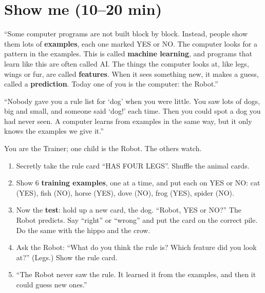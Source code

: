 \section{Show me (10--20 min)}
\begin{teacherscript}
\enquote{Some computer programs are not built block by block. Instead, people show them lots of \textbf{examples}, each one marked YES or NO. The computer looks for a pattern in the examples. This is called \textbf{machine learning}, and programs that learn like this are often called AI. The things the computer looks at, like legs, wings or fur, are called \textbf{features}. When it sees something new, it makes a guess, called a \textbf{prediction}. Today one of you is the computer: the Robot.}
\end{teacherscript}

\begin{analogy}
\enquote{Nobody gave you a rule list for \enquote{dog} when you were little. You saw lots of dogs, big and small, and someone said \enquote{dog!} each time. Then you could spot a dog you had never seen. A computer learns from examples in the same way, but it only knows the examples we give it.}
\end{analogy}

\begin{workedexample}
You are the Trainer; one child is the Robot. The others watch.
\begin{enumerate}[leftmargin=1.4em,itemsep=1pt]
  \item Secretly take the rule card \enquote{HAS FOUR LEGS}. Shuffle the animal cards.
  \item Show 6 \textbf{training examples}, one at a time, and put each on YES or NO: cat (YES), fish (NO), horse (YES), dove (NO), frog (YES), spider (NO).
  \item Now the \textbf{test}: hold up a new card, the dog. \enquote{Robot, YES or NO?} The Robot predicts. Say \enquote{right} or \enquote{wrong} and put the card on the correct pile. Do the same with the hippo and the crow.
  \item Ask the Robot: \enquote{What do you think the rule is? Which feature did you look at?} (Legs.) Show the rule card.
  \item \enquote{The Robot never saw the rule. It learned it from the examples, and then it could guess new ones.}
\end{enumerate}
\end{workedexample}

